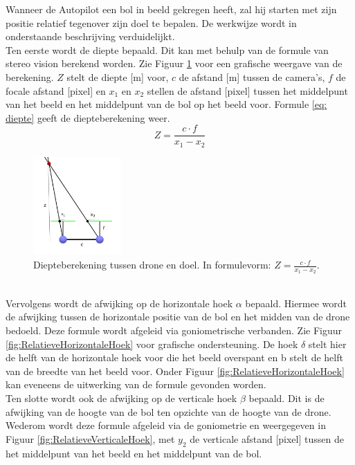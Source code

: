 \noindent
Wanneer de Autopilot een bol in beeld gekregen heeft, zal hij starten met zijn positie relatief tegenover zijn doel te bepalen. De werkwijze wordt in onderstaande beschrijving verduidelijkt.
\\
Ten eerste wordt de diepte bepaald. Dit kan met behulp van de formule van stereo vision \cite{website:techbriefs} berekend worden.
Zie Figuur \ref{fig:DiepteberekeningDroneEnDoel} voor een grafische weergave van de berekening. \(Z\) stelt de diepte [m] voor, \(c\) de afstand [m] tussen de camera's, \(f\) de focale afstand [pixel] en $x_1$ en $x_2$ stellen de afstand [pixel] tussen het middelpunt van het beeld en het middelpunt van de bol op het beeld voor. Formule \ref{eq: diepte} geeft de diepteberekening weer.
\begin{equation} \label{eq: diepte}
Z = \frac{c \cdot f}{x_1 - x_2}
\end{equation}
\begin{figure}[h]
	\centering
	\includegraphics[width=0.3\textwidth]{DiepteberekeningDroneEnDoel.png}
	\caption{Diepteberekening tussen drone en doel. In formulevorm: \(Z = \frac{c \cdot f}{x_1 - x_2}\).}
	\label{fig:DiepteberekeningDroneEnDoel}
\end{figure}
\\
Vervolgens wordt de afwijking op de horizontale hoek $\alpha$ bepaald. Hiermee wordt de afwijking tussen de horizontale positie van de bol en het midden van de drone bedoeld. Deze formule wordt afgeleid via goniometrische verbanden. Zie Figuur \ref{fig:RelatieveHorizontaleHoek} voor grafische ondersteuning. De hoek $\delta$ stelt hier de helft van de horizontale hoek voor die het beeld overspant en b stelt de helft van de breedte van het beeld voor. Onder Figuur \ref{fig:RelatieveHorizontaleHoek} kan eveneens de uitwerking van de formule gevonden worden.
\\
Ten slotte wordt ook de afwijking op de verticale hoek $\beta$ bepaald. Dit is de afwijking van de hoogte van de bol ten opzichte van de hoogte van de drone. Wederom wordt deze formule afgeleid via de goniometrie en weergegeven in Figuur \ref{fig:RelatieveVerticaleHoek}, met $y_2$ de verticale afstand [pixel] tussen de het middelpunt van het beeld en het middelpunt van de bol.
